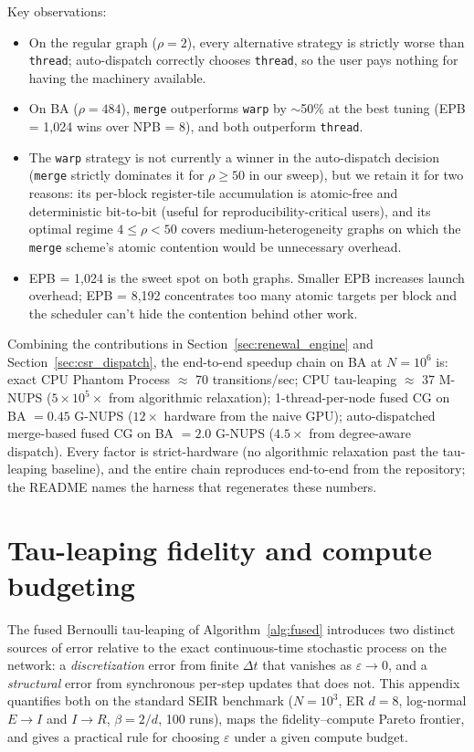 Key observations:
\begin{itemize}
\item On the regular graph ($\rho = 2$), every alternative strategy is strictly worse than \texttt{thread}; auto-dispatch correctly chooses \texttt{thread}, so the user pays nothing for having the machinery available.
\item On BA ($\rho = 484$), \texttt{merge} outperforms \texttt{warp} by $\sim$50\% at the best tuning (EPB = 1{,}024 wins over NPB = 8), and both outperform \texttt{thread}.
\item The \texttt{warp} strategy is not currently a winner in the auto-dispatch decision (\texttt{merge} strictly dominates it for $\rho \geq 50$ in our sweep), but we retain it for two reasons: its per-block register-tile accumulation is atomic-free and deterministic bit-to-bit (useful for reproducibility-critical users), and its optimal regime $4 \leq \rho < 50$ covers medium-heterogeneity graphs on which the \texttt{merge} scheme's atomic contention would be unnecessary overhead.
\item EPB = 1{,}024 is the sweet spot on both graphs. Smaller EPB increases launch overhead; EPB = 8{,}192 concentrates too many atomic targets per block and the scheduler can't hide the contention behind other work.
\end{itemize}

Combining the contributions in Section~\ref{sec:renewal_engine} and Section~\ref{sec:csr_dispatch}, the end-to-end speedup chain on BA at $N = 10^6$ is: exact CPU Phantom Process \citep{vajdi2020stochastic} $\approx$ 70 transitions/sec; CPU tau-leaping $\approx$ 37 M-NUPS ($5 \times 10^5\times$ from algorithmic relaxation); 1-thread-per-node fused CG on BA $= 0.45$ G-NUPS ($12\times$ hardware from the naive GPU); auto-dispatched merge-based fused CG on BA $= 2.0$ G-NUPS ($4.5\times$ from degree-aware dispatch). Every factor is strict-hardware (no algorithmic relaxation past the tau-leaping baseline), and the entire chain reproduces end-to-end from the repository; the README names the harness that regenerates these numbers.

\section{Tau-leaping fidelity and compute budgeting}
\label{app:fidelity}

The fused Bernoulli tau-leaping of Algorithm~\ref{alg:fused} introduces two distinct sources of error relative to the exact continuous-time stochastic process on the network: a \emph{discretization} error from finite $\Delta t$ that vanishes as $\varepsilon \to 0$, and a \emph{structural} error from synchronous per-step updates that does not. This appendix quantifies both on the standard SEIR benchmark ($N = 10^3$, ER $d = 8$, log-normal $E\to I$ and $I\to R$, $\beta = 2/d$, 100 runs), maps the fidelity--compute Pareto frontier, and gives a practical rule for choosing $\varepsilon$ under a given compute budget.

